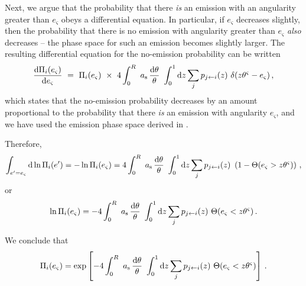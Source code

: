 Next, we argue that the probability that there \textit{is} an emission with an angularity greater than \(e_\varsigma\) obeys a differential equation.
%
In particular, if \(e_\varsigma\) decreases slightly, then the probability that there is no emission with angularity greater than \(e_\varsigma\) \textit{also} decreases -- the phase space for such an emission becomes slightly larger.
%
The resulting differential equation for the no-emission probability can be written
\begin{align}
    \dv{\Pi_i(e_\varsigma)}{e_\varsigma}
    \,\,
    =
    \,\,
    \Pi_i(e_\varsigma)
    \,\,\times\,\,
    4
    \int_0^R \,\, a_{\mathrm{s}} \, \frac{\dd\theta}{\theta}
    \,\,
    \int_0^1 \dd z \sum_j p_{j \leftarrow i}(z)
    \,\,
    \delta(z\theta^\varsigma - e_\varsigma)
    \,,
\end{align}
which states that the no-emission probability decreases by an amount proportional to the probability that there \textit{is} an emission with angularity \(e_\varsigma\), and we have used the emission phase space derived in .



Therefore,
\begin{align}
    \int_{e' = e_\varsigma} \dd \ln \Pi_i(e')
    =
    -\ln \Pi_i(e_\varsigma)
    =
    4
    \int_0^R \,\, a_{\mathrm{s}} \, \frac{\dd\theta}{\theta}
    \,\,
    \int_0^1 \dd z \sum_j p_{j \leftarrow i}(z)
    \,\,
    \left(
        1 -
        \Theta(e_\varsigma > z\theta^\varsigma)
    \right)
    \,,
\end{align}
or
\begin{align}
    \ln \Pi_i(e_\varsigma)
    =
    -4
    \int_0^R \,\, a_{\mathrm{s}} \, \frac{\dd\theta}{\theta}
    \,\,
    \int_0^1 \dd z \sum_j p_{j \leftarrow i}(z)
    \,\,
    \Theta(e_\varsigma < z\theta^\varsigma)
    \,.
\end{align}

\begin{answer}
    We conclude that
    \begin{align}
        \Pi_i(e_\varsigma)
        =
        \exp
        \left[
            -4
            \int_0^R \,\, a_{\mathrm{s}} \, \frac{\dd\theta}{\theta}
            \,\,
            \int_0^1 \dd z \sum_j p_{j \leftarrow i}(z)
            \,\,
            \Theta(e_\varsigma < z\theta^\varsigma)
        \right]
        \,.
    \end{align}
\end{answer}


